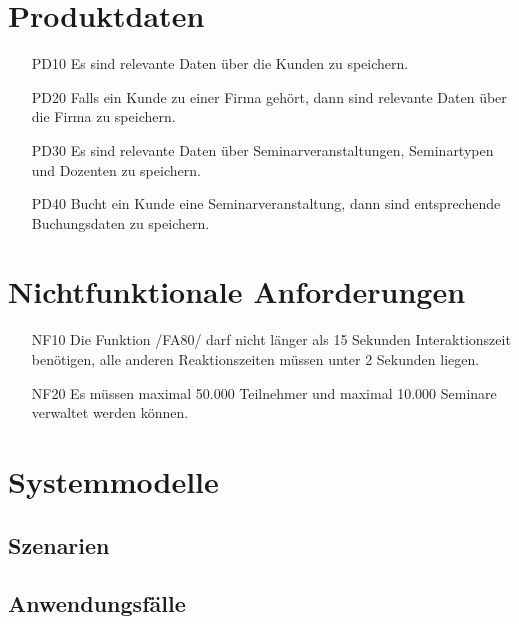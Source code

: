 \documentclass[parskip=full]{scrartcl}
\begin{document}
\section{Produktdaten}
\begin{itemize}[nosep]
\item[PD10] Es sind relevante Daten über die Kunden zu speichern.
\item[PD20] Falls ein Kunde zu einer Firma gehört, dann sind relevante Daten über die Firma zu speichern.
\item[PD30] Es sind relevante Daten über Seminarveranstaltungen, Seminartypen und Dozenten zu speichern.
\item[PD40] Bucht ein Kunde eine Seminarveranstaltung, dann sind entsprechende Buchungsdaten zu speichern.
\end{itemize}

\section{Nichtfunktionale Anforderungen}
\begin{itemize}[nosep]
\item[NF10] Die Funktion /FA80/ darf nicht länger als 15 Sekunden Interaktionszeit benötigen, alle anderen Reaktionszeiten müssen unter 2 Sekunden liegen.
\item[NF20] Es müssen maximal 50.000 Teilnehmer und maximal 10.000 Seminare verwaltet werden können.
\end{itemize}

\section{Systemmodelle}

\subsection{Szenarien}

\subsection{Anwendungsfälle}
\end{document}
